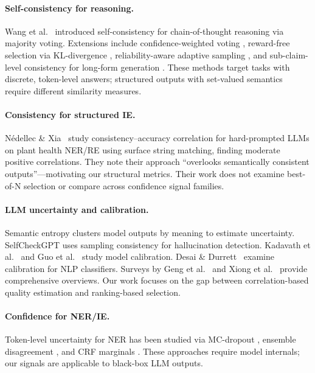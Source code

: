 \documentclass[11pt,a4paper]{article}
\begin{document}
\paragraph{Self-consistency for reasoning.}
Wang et al.~\cite{wang2023selfconsistency} introduced self-consistency for chain-of-thought reasoning via majority voting. Extensions include confidence-weighted voting \cite{cisc2025}, reward-free selection via KL-divergence \cite{selfcertainty2026}, reliability-aware adaptive sampling \cite{reasc2026}, and sub-claim-level consistency for long-form generation \cite{atomicsc2024}. These methods target tasks with discrete, token-level answers; structured outputs with set-valued semantics require different similarity measures.

\paragraph{Consistency for structured IE.}
N\'{e}dellec \& Xia~\cite{nedellec2026consistency} study consistency--accuracy correlation for hard-prompted LLMs on plant health NER/RE using surface string matching, finding moderate positive correlations. They note their approach ``overlooks semantically consistent outputs''---motivating our structural metrics. Their work does not examine best-of-N selection or compare across confidence signal families.

\paragraph{LLM uncertainty and calibration.}
Semantic entropy \cite{kuhn2023semantic} clusters model outputs by meaning to estimate uncertainty. SelfCheckGPT \cite{manakul2023selfcheckgpt} uses sampling consistency for hallucination detection. Kadavath et al.~\cite{kadavath2022language} and Guo et al.~\cite{guo2017calibration} study model calibration. Desai \& Durrett~\cite{desai2020calibration} examine calibration for NLP classifiers. Surveys by Geng et al.~\cite{geng2024survey} and Xiong et al.~\cite{xiong2024llmconfidence} provide comprehensive overviews. Our work focuses on the gap between correlation-based quality estimation and ranking-based selection.

\paragraph{Confidence for NER/IE.}
Token-level uncertainty for NER has been studied via MC-dropout \cite{gal2016dropout,shelmanov2021certain}, ensemble disagreement \cite{lakshminarayanan2017simple}, and CRF marginals \cite{culotta2004confidence}. These approaches require model internals; our signals are applicable to black-box LLM outputs.
\end{document}
